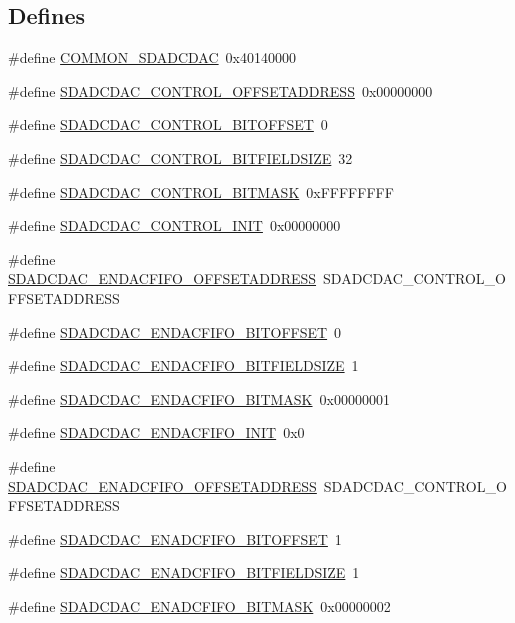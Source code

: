 \subsection*{Defines}
\begin{DoxyCompactItemize}
\item 
\#define \hyperlink{a00569_a3957de51060555c8741e7927dc8298b4}{COMMON\_\-SDADCDAC}~0x40140000
\item 
\#define \hyperlink{a00569_a3323519aa07839e37ec742e23d9ed04d}{SDADCDAC\_\-CONTROL\_\-OFFSETADDRESS}~0x00000000
\item 
\#define \hyperlink{a00569_a2eed3524e225d1603290e70f40f30080}{SDADCDAC\_\-CONTROL\_\-BITOFFSET}~0
\item 
\#define \hyperlink{a00569_a2e12a7c8641c44fd34d9e5ec940e97d4}{SDADCDAC\_\-CONTROL\_\-BITFIELDSIZE}~32
\item 
\#define \hyperlink{a00569_a0a907c0cd7a9389798066e56a19b9197}{SDADCDAC\_\-CONTROL\_\-BITMASK}~0xFFFFFFFF
\item 
\#define \hyperlink{a00569_ab03826f3c55c09f402a4a379291a7b6e}{SDADCDAC\_\-CONTROL\_\-INIT}~0x00000000
\item 
\#define \hyperlink{a00569_aaa1fa56a6fac81d1598fb5860753ac39}{SDADCDAC\_\-ENDACFIFO\_\-OFFSETADDRESS}~SDADCDAC\_\-CONTROL\_\-OFFSETADDRESS
\item 
\#define \hyperlink{a00569_afbc78c34c7c61a6541464941d06ff534}{SDADCDAC\_\-ENDACFIFO\_\-BITOFFSET}~0
\item 
\#define \hyperlink{a00569_a6eb7283c07830018e2b693fb39d16f1a}{SDADCDAC\_\-ENDACFIFO\_\-BITFIELDSIZE}~1
\item 
\#define \hyperlink{a00569_a28f551acc66eca12b4e5287288b58ee7}{SDADCDAC\_\-ENDACFIFO\_\-BITMASK}~0x00000001
\item 
\#define \hyperlink{a00569_a88a8c4a1b125f5e9600eb3b1c4fc9875}{SDADCDAC\_\-ENDACFIFO\_\-INIT}~0x0
\item 
\#define \hyperlink{a00569_a9bec7e44a8e4156e729cace875e708ab}{SDADCDAC\_\-ENADCFIFO\_\-OFFSETADDRESS}~SDADCDAC\_\-CONTROL\_\-OFFSETADDRESS
\item 
\#define \hyperlink{a00569_abe750ee435f12405c386b78a2357297d}{SDADCDAC\_\-ENADCFIFO\_\-BITOFFSET}~1
\item 
\#define \hyperlink{a00569_af1e5290bd80338ca1d089bbca479175c}{SDADCDAC\_\-ENADCFIFO\_\-BITFIELDSIZE}~1
\item 
\#define \hyperlink{a00569_a4eff085779682a3a52d59c7c9dca102c}{SDADCDAC\_\-ENADCFIFO\_\-BITMASK}~0x00000002
\item 

\end{DoxyCompactItemize}
